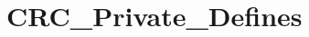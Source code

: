 \hypertarget{group___c_r_c___private___defines}{\section{C\-R\-C\-\_\-\-Private\-\_\-\-Defines}
\label{group___c_r_c___private___defines}
}
